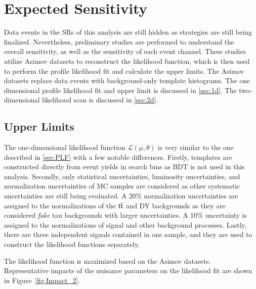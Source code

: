 \chapter{Expected Sensitivity}
\label{chap:Sensitivity}

Data events in the \acp{SR} of this analysis are still hidden as strategies are still being finalized. Nevertheless, preliminary studies are performed to understand the overall sensitivity, as well as the sensitivity of each event channel. These studies utilize Asimov datasets to reconstruct the likelihood function, which is then used to perform the profile likelihood fit and calculate the upper limits. The Asimov datasets replace data events with background-only template histograms. The one dimensional profile likelihood fit and upper limit is discussed in \autoref{sec:1d}. The two-dimensional likelihood scan is discussed in \autoref{sec:2d}.

\section{Upper Limits}
\label{sec:1d}

The one-dimensional likelihood function $\mathcal{L}(\mu, \theta)$ is very similar to the one described in \autoref{sec:PLF} with a few notable differences. Firstly, templates are constructed directly from event yields in search bins as \ac{BDT} is not used in this analysis. Secondly, only statistical uncertainties, luminosity uncertainties, and normalization uncertainties of \ac{MC} samples are considered as other systematic uncertainties are still being evaluated. A 20\% normalization uncertainties are assigned to the normalizations of the $\textsf{t}\overline{\textsf{t}}$ and \ac{DY} backgrounds as they are considered \emph{fake} tau backgrounds with larger uncertainties. A 10\% uncertainty is assigned to the normalizations of signal and other background processes. Lastly, there are three independent signals contained in one sample, and they are used to construct the likelihood functions separately.

The likelihood function is maximized based on the Asimov datasets. Representative impacts of the nuisance parameters on the likelihood fit are shown in Figure~\ref{fig:Impact_2}.

